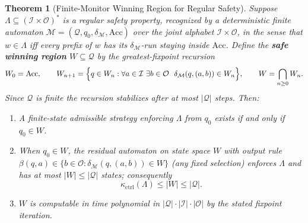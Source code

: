 \documentclass[12pt]{article}
\newtheorem{theorem}{Theorem}[section]
\theoremstyle{definition}
\begin{document}
\begin{theorem}[Finite-Monitor Winning Region for Regular Safety]
\label{thm:finite-monitor}
Suppose $\Lambda\subseteq(\mathcal I\times\mathcal O)^*$ is a regular safety
property, recognized by a deterministic finite automaton
$\mathcal M=(\mathcal Q,q_0,\delta_{\mathcal M},\mathrm{Acc})$ over the joint
alphabet $\mathcal I\times\mathcal O$, in the sense that $w\in\Lambda$ iff
every prefix of $w$ has its $\delta_{\mathcal M}$-run staying inside
$\mathrm{Acc}$.  Define the \textbf{safe winning region}
$W\subseteq\mathcal Q$ by the greatest-fixpoint recursion
\[
W_0=\mathrm{Acc},
\qquad
W_{n+1}
=
\Bigl\{
q\in W_n:\forall a\in\mathcal I\ \exists b\in\mathcal O\ \
\delta_{\mathcal M}(q,(a,b))\in W_n
\Bigr\},
\qquad
W=\bigcap_{n\ge0}W_n.
\]
Since $\mathcal Q$ is finite the recursion stabilizes after at most
$|\mathcal Q|$ steps.  Then:
\begin{enumerate}[label=(\roman*)]
\item A finite-state admissible strategy enforcing $\Lambda$ from $q_0$
exists if and only if $q_0\in W$.
\item When $q_0\in W$, the residual automaton on state space $W$ with output
rule $\beta(q,a)\in\{b\in\mathcal O:\delta_{\mathcal M}(q,(a,b))\in W\}$ (any
fixed selection) enforces $\Lambda$ and has at most $|W|\le|\mathcal Q|$
states; consequently
\[
\kappa_{\mathrm{ctrl}}(\Lambda)\le|W|\le|\mathcal Q|.
\]
\item $W$ is computable in time polynomial in
$|\mathcal Q|\cdot|\mathcal I|\cdot|\mathcal O|$ by the stated fixpoint
iteration.
\end{enumerate}
\end{theorem}
\end{document}
